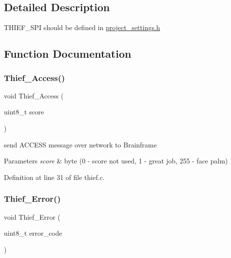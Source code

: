 \subsection{Detailed Description}
T\+H\+I\+E\+F\+\_\+\+S\+PI should be defined in \mbox{\hyperlink{project__settings_8h}{project\+\_\+settings.\+h}} 

\subsection{Function Documentation}
\mbox{\label{group__thief_ga9452fbc6fc191bdc2b07c6f64fcaf4d1}} 
\subsubsection{\texorpdfstring{Thief\_Access()}{Thief\_Access()}}
{\footnotesize\ttfamily void Thief\+\_\+\+Access (\begin{DoxyParamCaption}\item[{uint8\+\_\+t}]{score }\end{DoxyParamCaption})}



send A\+C\+C\+E\+SS message over network to Brainframe 


\begin{DoxyParams}{Parameters}
{\em score} & byte (0 -\/ score not used, 1 -\/ great job, 255 -\/ face palm) \\
\hline
\end{DoxyParams}


Definition at line 31 of file thief.\+c.

\mbox{\label{group__thief_gad35f1b0518e285e9b5ea7b7be1a1c6e0}} 
\subsubsection{\texorpdfstring{Thief\_Error()}{Thief\_Error()}}
{\footnotesize\ttfamily void Thief\+\_\+\+Error (\begin{DoxyParamCaption}\item[{uint8\+\_\+t}]{error\+\_\+code }\end{DoxyParamCaption})}



